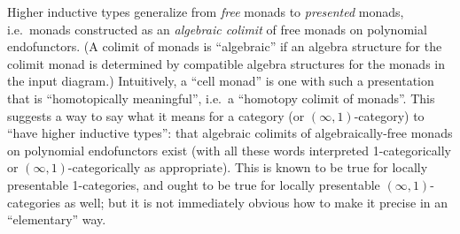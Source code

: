 Higher inductive types generalize from \emph{free} monads to \emph{presented} monads, i.e.\ monads constructed as an \emph{algebraic colimit} of free monads on polynomial endofunctors.
(A colimit of monads is ``algebraic'' if an algebra structure for the colimit monad is determined by compatible algebra structures for the monads in the input diagram.)
Intuitively, a ``cell monad'' is one with such a presentation that is ``homotopically meaningful'', i.e.\ a ``homotopy colimit of monads''.
This suggests a way to say what it means for a category (or $(\infty,1)$-category) to ``have higher inductive types'': that algebraic colimits of algebraically-free monads on polynomial endofunctors exist (with all these words interpreted 1-categorically or $(\infty,1)$-categorically as appropriate).
This is known to be true for locally presentable 1-categories, and ought to be true for locally presentable $(\infty,1)$-categories as well; but it is not immediately obvious how to make it precise in an ``elementary'' way.

